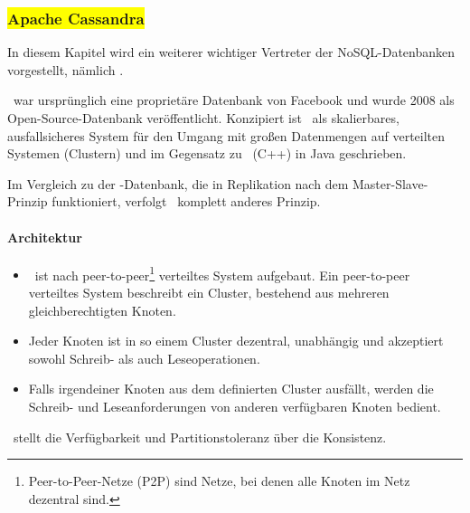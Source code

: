 \subsubsection{\colorbox{yellow}{Apache Cassandra}}

In diesem Kapitel wird ein weiterer wichtiger Vertreter der NoSQL-Datenbanken vorgestellt, nämlich \cass.

\cass\ war ursprünglich eine proprietäre Datenbank von Facebook und wurde 2008 als Open-Source-Datenbank veröffentlicht. Konzipiert ist \cass\ als skalierbares, ausfallsicheres System für den Umgang mit großen Datenmengen auf verteilten Systemen (Clustern) und im Gegensatz zu \mongo\ (C++) in Java geschrieben.


Im Vergleich zu der \mongo-Datenbank, die in Replikation nach dem Master-Slave-Prinzip funktioniert, verfolgt \cass\ komplett anderes Prinzip. %
\paragraph{Architektur}
\begin{itemize}
\item \cass\ ist nach peer-to-peer\footnote{Peer-to-Peer-Netze (P2P) sind Netze, bei denen alle Knoten im Netz dezentral sind.} verteiltes System aufgebaut. Ein peer-to-peer verteiltes System beschreibt ein Cluster, bestehend aus mehreren gleichberechtigten Knoten.  
\item Jeder Knoten ist in so einem Cluster dezentral, unabhängig und akzeptiert sowohl Schreib- als auch Leseoperationen.
\item Falls irgendeiner Knoten aus dem definierten Cluster ausfällt, werden die Schreib- und Leseanforderungen von anderen verfügbaren Knoten bedient.
\end{itemize}
\cass\ stellt die Verfügbarkeit und Partitionstoleranz über die Konsistenz.

